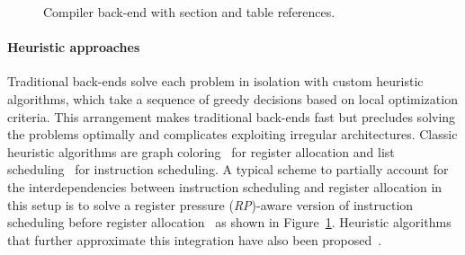 \documentclass[acmsmall,authorversion,nonacm]{acmart}
\begin{document}
\begin{figure}
{
 }
  \caption{Compiler back-end with section and table references.}
  \label{fig:backend}
\end{figure}

\paragraph{Heuristic approaches}

Traditional back-ends solve each problem in isolation with custom
heuristic algorithms, which take a sequence of greedy decisions based
on local optimization criteria.
This arrangement makes traditional back-ends fast but precludes
solving the problems optimally and complicates exploiting irregular
architectures.
Classic heuristic algorithms are graph coloring~\cite{Chaitin1981} for
register allocation and list scheduling~\cite{Rau1993} for instruction
scheduling.
A typical scheme to partially account for the interdependencies
between instruction scheduling and register allocation in this setup
is to solve a register pressure (\emph{RP})-aware version of
instruction scheduling before register allocation~\cite{Goodman1988}
as shown in Figure~\ref{fig:backend}.
Heuristic algorithms that further approximate this integration have
also been
proposed~\cite{Bradlee1991,Pinter1993,Motwani1995,Berson1996}.
\end{document}
